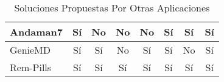 \begin{table}[H]
{\begin{tabular}{|l|c|c|c|c|c|c|c|}
		Andaman7                         & Sí              & No                                                                         & No                                                                            & No                                                                      & Sí                                                           & Sí                                                                    & Sí                                                                 \\ \hline
		GenieMD                          & Sí              & Sí                                                                         & No                                                                            & Sí                                                                      & Sí                                                           & No                                                                    & Sí                                                                 \\ \hline
		Rem-Pills                          & Sí              & Sí                                                                         & Sí                                                                            & Sí                                                                      & Sí                                                           & Sí                                                                    & Sí                                                                 \\ \hline
	\end{tabular}
	}
\caption{Soluciones Propuestas Por Otras Aplicaciones}
\label{SolucionesProp}
\end{table}

